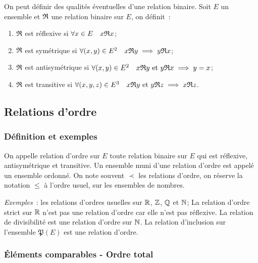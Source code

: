 \begin{defdef}
    On peut définir des qualités éventuelles d'une relation binaire. Soit \(E\) 
    un ensemble et \(\mathfrak{R}{}\) une relation binaire sur \(E\), on définit~:
    \begin{enumerate}
        \item \(\mathfrak{R}{}\) est réflexive si \(\forall x \in E \quad 
            x\mathfrak{R}{}x\);
        \item \(\mathfrak{R}{}\) est symétrique si \(\forall (x,y) \in E^2 \quad 
            x\mathfrak{R}{}y \implies y\mathfrak{R}{}x\);
        \item \(\mathfrak{R}{}\) est antisymétrique si \(\forall (x,y) \in E^2 \quad 
            x\mathfrak{R}{}y \text{~et~} y\mathfrak{R}{}x \implies y = x\);
        \item \(\mathfrak{R}{}\) est transitive si \(\forall (x,y,z) \in E^3 \quad 
            x\mathfrak{R}{}y \text{~et~} y\mathfrak{R}{}z \implies x\mathfrak{R}{}z\).
    \end{enumerate}
\end{defdef}

\subsection{Relations d'ordre}
\label{chap3-subsec:relationdordre}

\subsubsection{Définition et exemples}
\label{chap3-subsubsec:relationordredef}

\begin{defdef}
    On appelle relation d'ordre sur \(E\) toute relation binaire sur \(E\) qui 
    est réflexive, antisymétrique et transitive. Un ensemble muni d'une relation 
    d'ordre est appelé un ensemble ordonné. On note souvent \(\prec\) les 
    relations d'ordre, on réserve la notation \(\leqslant\) à l'ordre usuel, sur 
    les ensembles de nombres.
\end{defdef}

\emph{Exemples}~: les relations d'ordres usuelles sur \(\mathbb{R}\), \(\mathbb{Z}\), \(\mathbb{Q}\) et 
\(\mathbb{N}\); La relation d'ordre strict sur \(\mathbb{R}\) n'est pas une relation d'ordre car 
elle n'est pas réflexive. La relation de divisibilité est une relation d'ordre 
sur \(\mathbb{N}\). La relation d'inclusion sur l'ensemble \(\mathfrak{P}(E)\) est une 
relation d'ordre.

\subsubsection{Éléments comparables - Ordre total}
\label{chap3-subsubsec:ordretotal}

